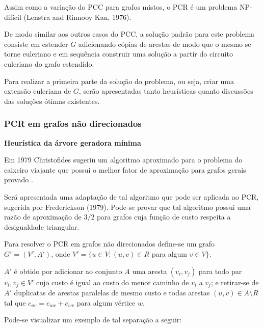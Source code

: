 \documentclass[12pt, a4paper]{article}
\begin{document}
    Assim como a variação do PCC para grafos mistos, o PCR é um problema NP-difícil  (Lenstra and Rinnooy Kan, 1976).

    De modo similar aos outros casos do PCC, a solução padrão para este problema consiste em estender $G$ adicionando cópias de arestas de modo que o mesmo se torne euleriano e em sequência construir uma solução a partir do circuito euleriano do grafo estendido.

    Para realizar a primeira parte da solução do problema, ou seja, criar uma extensão euleriana de $G$, serão apresentadas tanto heurísticas quanto discussões das soluções ótimas existentes.

        \subsubsection{PCR em grafos não direcionados}


        \textbf{Heurística da árvore geradora mínima}

        Em 1979 Christofides sugeriu um algoritmo aproximado para o problema do caixeiro viajante que possui o melhor fator de aproximação para grafos gerais provado \cite{wiki-christofides}. %

        Será apresentada uma adaptação de tal algoritmo que pode ser aplicada ao PCR, sugerida por Frederickson (1979).
        Pode-se provar que tal algoritmo possui uma razão de aproximação de $3/2$ para grafos cuja função de custo respeita a desigualdade triangular. 

        Para resolver o PCR em grafos não direcionados define-se um grafo $G' = (V', A')$, onde $V' = \{ u \in V : (u, v) \in R$ para algum $v \in V\}$.

        $A'$ é obtido por adicionar ao conjunto $A$ uma aresta $(v_i, v_j)$ para todo par $v_i, v_j \in V'$ cujo custo é igual ao custo do menor caminho de $v_i$ a $v_j$; e retirar-se de $A'$ duplicatas de arestas paralelas de mesmo custo e todas arestas $(u, v) \in A \setminus R$ tal que $c_{uv} = c_{uw} + c_{wv}$ para algum vértice $w$.

        Pode-se visualizar um exemplo de tal separação a seguir:
\end{document}
